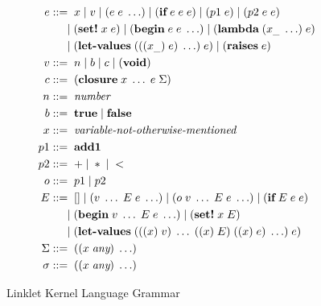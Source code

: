 \begin{figure}[!htbp]
    \centering
    \small
    \begin{align*}
        e &::=\; x \;|\; v \;|\; (e\; e\;\ldots) \;|\; (\textbf{if}\; e\; e\; e) \;|\; (p1\; e) \;|\; (p2\; e\; e) \\
          &\;\hspace*{1.3em}|\; (\textbf{set!}\; x\; e) \;|\; (\textbf{begin}\; e\; e\;\ldots) \;|\; (\textbf{lambda}\; (x_{\_}\;\ldots)\; e) \\
          &\;\hspace*{1.3em}|\; (\textbf{let-values}\; (((x_{\_})\; e)\;\ldots)\; e) \;|\; (\textbf{raises}\; e)\\
        v &::=\; n \;|\; b \;|\; c \;|\; (\textbf{void})\\
        c &::=\; (\textbf{closure}\; x\;\ldots\; e\; \Sigma)\\
        n &::=\; \textit{number}\\
        b &::=\; \textbf{true} \;|\; \textbf{false}\\
        x &::=\; \textit{variable-not-otherwise-mentioned}\\
        p1 &::=\; \textbf{add1}\\
        p2 &::=\; + \;|\; * \;|\; <\\
        o &::=\; p1 \;|\; p2\\
        E &::=\; [] \;|\; (v\;\ldots\; E\; e\;\ldots) \;|\; (o\; v\;\ldots\; E\; e\;\ldots) \;|\; (\textbf{if}\; E\; e\; e)\\
          &\;\hspace*{1.3em}|\; (\textbf{begin}\; v\;\ldots\; E\; e\;\ldots) \;|\; (\textbf{set!}\; x\; E) \\
          &\;\hspace*{1.3em}|\; (\textbf{let-values}\; (((x)\; v)\;\ldots\; ((x)\; E)\; ((x)\; e)\;\ldots)\; e)\\
        \Sigma &::=\; ((x\; \textit{any})\;\ldots)\\
        \sigma &::=\; ((x\; \textit{any})\;\ldots)
    \end{align*}

    \vspace{-1em}

    \caption{Linklet Kernel Language Grammar}
\end{figure}
